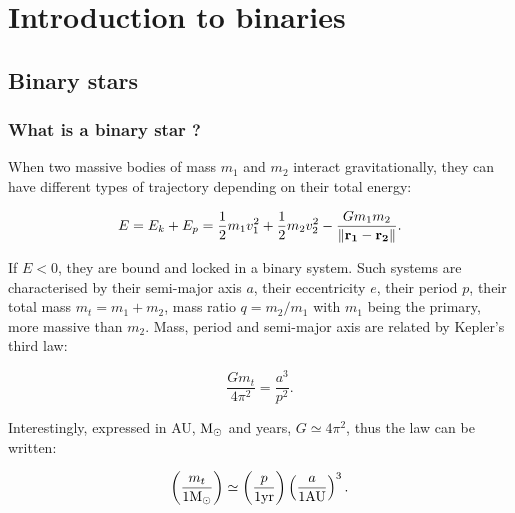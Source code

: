 
\chapter{Introduction to binaries}

\section{Binary stars}

\subsection{What is a binary star ?}

When two massive bodies of mass $m_1$ and $m_2$ interact gravitationally, they can have different types of trajectory depending on their total energy:

\begin{equation}
E = E_k + E_p = \frac{1}{2} m_1 v_1^2 + \frac{1}{2} m_2 v_2^2  - \frac{G m_1 m_2}{\| \bold{r_1} - \bold{r_2}\| }.
\end{equation}


If $E<0$, they are bound and locked in a binary system. Such systems are characterised by their semi-major axis $a$, their eccentricity $e$, their period $p$, their total mass $m_t = m_1 + m_2$, mass ratio $q = m_2/m_1$ with $m_1$ being the primary, more massive than $m_2$.
Mass, period and semi-major axis are related by Kepler's third law:

\begin{equation}
\frac{G m_t}{4\pi^2} =  \frac{a^3}{p^2}.
\end{equation}

Interestingly, expressed in AU, ${\textrm{M}_\odot}$ and years, $G \simeq 4 \pi^2$, thus the law can be written:

\begin{equation}
\left( \frac{m_t}{1 {\textrm{M}_\odot}} \right) \simeq \left( \frac{p}{1 \textrm{yr}} \right) \left( \frac{a}{1 \textrm{AU}} \right)^3 .
\end{equation}



